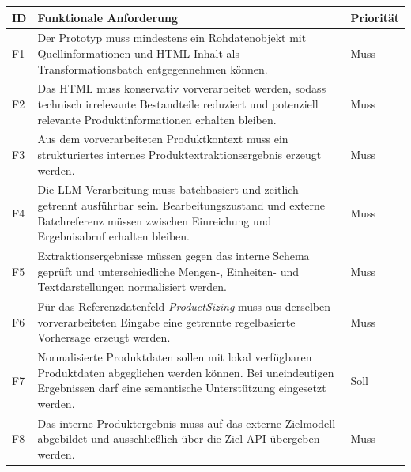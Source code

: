 \begin{table}[H]
    \centering
    \footnotesize
    \setlength{\tabcolsep}{4pt}
    \renewcommand{\arraystretch}{1.08}
    \begin{tabular}{
        |p{}
        |p{}
        |p{}|
    }
        \hline
        \textbf{ID} &
        \textbf{Funktionale Anforderung} &
        \textbf{Priorität} \\
        \hline

        F1 &
        Der Prototyp muss mindestens ein Rohdatenobjekt mit Quellinformationen und HTML-Inhalt als Transformationsbatch entgegennehmen können. &
        Muss \\
        \hline

        F2 &
        Das HTML muss konservativ vorverarbeitet werden, sodass technisch irrelevante Bestandteile reduziert und potenziell relevante Produktinformationen erhalten bleiben. &
        Muss \\
        \hline

        F3 &
        Aus dem vorverarbeiteten Produktkontext muss ein strukturiertes internes Produktextraktionsergebnis erzeugt werden. &
        Muss \\
        \hline

        F4 &
        Die LLM-Verarbeitung muss batchbasiert und zeitlich getrennt ausführbar sein. Bearbeitungszustand und externe Batchreferenz müssen zwischen Einreichung und Ergebnisabruf erhalten bleiben. &
        Muss \\
        \hline

        F5 &
        Extraktionsergebnisse müssen gegen das interne Schema geprüft und unterschiedliche Mengen-, Einheiten- und Textdarstellungen normalisiert werden. &
        Muss \\
        \hline

        F6 &
        Für das Referenzdatenfeld \textit{ProductSizing} muss aus derselben vorverarbeiteten Eingabe eine getrennte regelbasierte Vorhersage erzeugt werden. &
        Muss \\
        \hline

        F7 &
        Normalisierte Produktdaten sollen mit lokal verfügbaren Produktdaten abgeglichen werden können. Bei uneindeutigen Ergebnissen darf eine semantische Unterstützung eingesetzt werden. &
        Soll \\
        \hline

        F8 &
        Das interne Produktergebnis muss auf das externe Zielmodell abgebildet und ausschließlich über die Ziel-API übergeben werden. &
        Muss \\
        \hline


\end{tabular}
\end{table}
